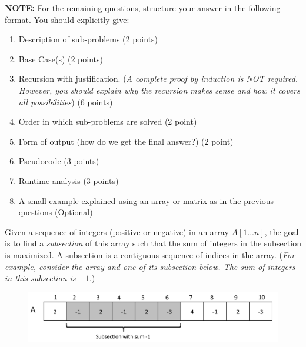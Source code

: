 \documentclass[answers]{exam}
\begin{document}
\begin{questions}
\hrulefill

\textbf{NOTE: }For the remaining questions, structure your answer in the following format. You should explicitly give:

\begin{enumerate}
    \item Description of sub-problems (2 points) 

    \item Base Case(s) (2 points)
    
    \item Recursion with justification. 
    ({\it A complete proof by induction is NOT required. However, you should explain why the recursion makes sense and how it covers all possibilities}) (6 points)

    \item Order in which sub-problems are solved  (2 point)

    \item Form of output (how do we get the final answer?) (2 point) 

    \item Pseudocode (3 points) 

    \item Runtime analysis (3 points)

    \item  A small example explained using an array or matrix as in the previous questions (Optional)
\end{enumerate}

\hrulefill

\newpage

\question[20] Given a sequence of integers (positive or negative) in an array $A[1...n]$, the goal is to find a {\em subsection} of this array such that the sum of integers in the subsection is maximized. A subsection is a contiguous sequence of indices in the array.
({\it For example, consider the array and one of its subsection below. The sum of integers in this subsection is $-1$.})


\begin{figure}[h]
\centering
\includegraphics[scale=0.23]{embed/subsection}
\end{figure}


\end{questions}
\end{document}
